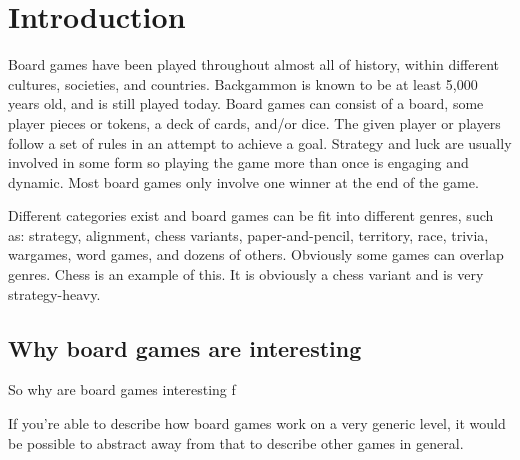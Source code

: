 \chapter{Introduction}
\label{chap:introduction}

Board games have been played throughout almost all of history, within different cultures, societies, and countries. Backgammon is known to be at least 5,000 years old, and is still played today. Board games can consist of a board, some player pieces or tokens, a  deck of cards, and/or dice. The given player or players follow a set of rules in an attempt to achieve a goal. Strategy and luck are usually involved in some form so playing the game more than once is engaging and dynamic. Most board games only involve one winner at the end of the game.

Different categories exist and board games can be fit into different genres, such as: strategy, alignment, chess variants, paper-and-pencil, territory, race, trivia, wargames, word games, and dozens of others. Obviously some games can overlap genres. Chess is an example of this. It is obviously a chess variant and is very strategy-heavy.

\section{Why board games are interesting}
So why are board games interesting f

If you're able to describe how board games work on a very generic level, it would be possible to abstract away from that to describe other games in general.

